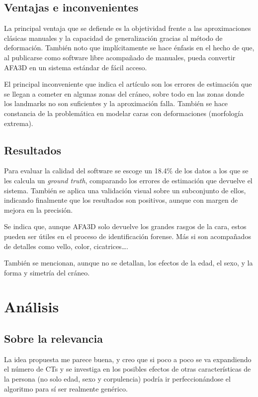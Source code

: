 \documentclass[13pt,a4paper]{article}
\begin{document}
\subsection{Ventajas e inconvenientes}

La principal ventaja que se defiende es la objetividad frente a las aproximaciones clásicas manuales y la capacidad de generalización gracias al método de deformación. También noto que implícitamente se hace énfasis en el hecho de que, al publicarse como software libre acompañado de manuales, pueda convertir AFA3D en un sistema estándar de fácil acceso.

\vspace{\baselineskip}

El principal inconveniente que indica el artículo son los errores de estimación que se llegan a cometer en algunas zonas del cráneo, sobre todo en las zonas donde los landmarks no son suficientes y la aproximación falla. También se hace constancia de la problemática en modelar caras con deformaciones (morfología extrema).

\subsection{Resultados}

Para evaluar la calidad del software se escoge un 18.4\% de los datos a los que se les calcula un \textit{ground truth}, comparando los errores de estimación que devuelve el sistema.
También se aplica una validación visual sobre un subconjunto de ellos, indicando finalmente que los resultados son positivos, aunque con margen de mejora en la precisión. 

Se indica que, aunque AFA3D solo devuelve los grandes rasgos de la cara, estos pueden ser útiles en el proceso de identificación forense. Más si son acompañados de detalles como vello, color, cicatrices\dots.

También se mencionan, aunque no se detallan, los efectos de la edad, el sexo, y la forma y simetría del cráneo.

\section{Análisis}

\subsection{Sobre la relevancia}

La idea propuesta me parece buena, y creo que si poco a poco se va expandiendo el número de CTs y se investiga en los posibles efectos de otras características de la persona (no solo edad, sexo y corpulencia) podría ir perfeccionándose el algoritmo para sí ser realmente genérico.
\end{document}
